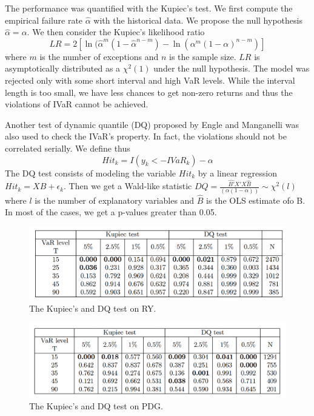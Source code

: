 \documentclass[12pt, a4paper]{article}
\begin{document}
The performance was quantified with the Kupiec's test. We first compute the empirical failure rate $\hat{\alpha}$ with the historical data. We propose the null hypothesis $\hat{\alpha} = \alpha$. We then consider the Kupiec's likelihood ratio
$$
LR = 2[\ln(\hat{\alpha}^m(1-\hat{\alpha}^{n-m}) - \ln(\alpha^m(1-\alpha)^{n-m})]
$$
where $m$ is the number of exceptions and $n$ is the sample size. $LR$ is asymptotically distributed as a $\chi^2(1)$ under the null hypothesis. The model was rejected only with some short interval and high VaR levels. While the interval length is too small, we have less chances to get non-zero returns and thus the violations  of IVaR cannot be achieved.

Another test of dynamic quantile (DQ) proposed by Engle and Manganelli was also used to check the IVaR's property. In fact, the violations should not be correlated serially. We define thus
$$
Hit_k = I(y_k  < -IVaR_k) - \alpha
$$
The DQ test consists of modeling the variable $Hit_k$ by a linear regression $Hit_k = XB + \epsilon_k$. Then we get a Wald-like statistic $DQ=\frac{\hat{B'}X'X\hat{B}}{(\alpha(1-\alpha))} \sim \chi^2(l)$ where $l$ is the number of explanatory variables and $\hat{B}$ is the OLS estimate ofo B. In most of the cases, we get a p-values greater than 0.05.


\begin{figure}[htpf!]
    \centering
    \includegraphics[scale=0.3]{IVaR results RY.png}
    \caption{The Kupiec's and DQ test on RY.}
    \label{fig:IVaR_results_RY}
\end{figure}

\begin{figure}[htpf!]
    \centering
    \includegraphics[scale=0.3]{IVaR results PDG.png}
    \caption{The Kupiec's and DQ test on PDG.}
    \label{fig:IVaR_results_PDG}
\end{figure}
\end{document}
